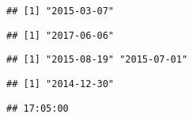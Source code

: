 \documentclass[]{article}
\newenvironment{Shaded}{\begin{snugshade}}{\end{snugshade}}
\newcommand{\KeywordTok}[1]{\textcolor[rgb]{0.13,0.29,0.53}{\textbf{#1}}}
\newcommand{\StringTok}[1]{\textcolor[rgb]{0.31,0.60,0.02}{#1}}
\newcommand{\NormalTok}[1]{#1}
\begin{document}
\begin{Shaded}
\end{Shaded}

\begin{verbatim}
## [1] "2015-03-07"
\end{verbatim}

\begin{Shaded}
\end{Shaded}

\begin{verbatim}
## [1] "2017-06-06"
\end{verbatim}

\begin{Shaded}
\end{Shaded}

\begin{verbatim}
## [1] "2015-08-19" "2015-07-01"
\end{verbatim}

\begin{Shaded}
\end{Shaded}

\begin{verbatim}
## [1] "2014-12-30"
\end{verbatim}

\begin{Shaded}
\end{Shaded}

\begin{verbatim}
## 17:05:00
\end{verbatim}
\end{document}
